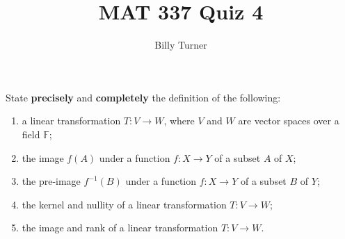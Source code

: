 \documentclass[12pt,answers]{exam}
\newcommand{\F}{\mathbb{F}}
\newenvironment{problem}[2][Problem]{\begin{trivlist}
\item[\hskip \labelsep {\bfseries #1}\hskip \labelsep {\bfseries #2.}]}{\end{trivlist}}
\begin{document}
\title{MAT 337 Quiz 4} 
\author{Billy Turner}
\maketitle
\thispagestyle{empty}

\begin{problem}{1}
State \textbf{precisely} and \textbf{completely} the definition of the following:
\begin{enumerate}[label=(\alph*)]
\item a linear transformation $T:V\rightarrow W$, where $V$ and $W$ are vector spaces over a field $\F$;
\item the image $f(A)$ under a function $f:X\rightarrow Y$ of a subset $A$ of $X$;
\item the pre-image $f^{-1}(B)$ under a function $f:X\rightarrow Y$ of a subset $B$ of $Y$;
\item the kernel and nullity of a linear transformation $T:V\rightarrow W$;
\item the image and rank of a linear transformation $T:V\rightarrow W$.
\end{enumerate}
\end{problem}
\end{document}
